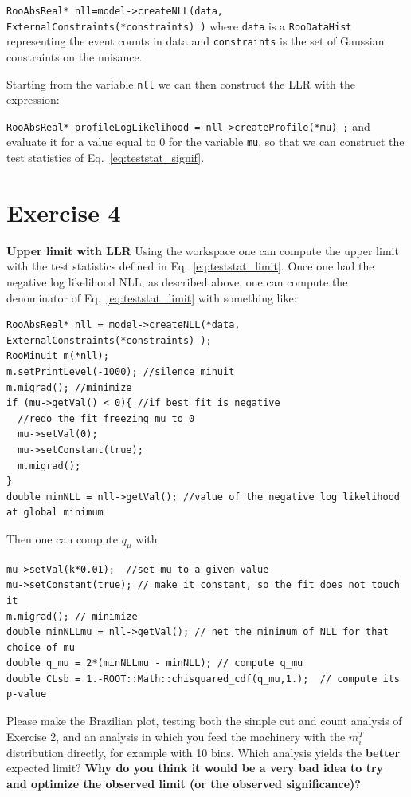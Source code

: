 \documentclass[a4paper,12pt]{article}
\begin{document}
\verb+RooAbsReal* nll=model->createNLL(data, ExternalConstraints(*constraints) )+
where \verb+data+ is a \verb!RooDataHist! representing the event counts in data
and \verb+constraints+ is the set of Gaussian constraints on the nuisance.

Starting from the variable \verb+nll+ we can then construct the LLR with the
expression:

\verb+RooAbsReal* profileLogLikelihood = nll->createProfile(*mu) ;+
and evaluate it for a value equal to 0 for the variable \verb+mu+, so that we
can construct the test statistics of Eq.~\ref{eq:teststat_signif}.


\section*{Exercise 4}
{\bf Upper limit with LLR}
Using the workspace one can compute the upper limit with the test statistics
defined in Eq.~\ref{eq:teststat_limit}.
Once one had the negative log likelihood NLL, as described above, one can
compute the denominator of Eq.~\ref{eq:teststat_limit} with something like:

\begin{lstlisting}
RooAbsReal* nll = model->createNLL(*data, ExternalConstraints(*constraints) );
RooMinuit m(*nll);
m.setPrintLevel(-1000); //silence minuit
m.migrad(); //minimize
if (mu->getVal() < 0){ //if best fit is negative
  //redo the fit freezing mu to 0
  mu->setVal(0);
  mu->setConstant(true);
  m.migrad();
}
double minNLL = nll->getVal(); //value of the negative log likelihood at global minimum
\end{lstlisting}

Then one can compute $q_\mu$ with
\begin{lstlisting}
mu->setVal(k*0.01);  //set mu to a given value
mu->setConstant(true); // make it constant, so the fit does not touch it
m.migrad(); // minimize
double minNLLmu = nll->getVal(); // net the minimum of NLL for that choice of mu
double q_mu = 2*(minNLLmu - minNLL); // compute q_mu
double CLsb = 1.-ROOT::Math::chisquared_cdf(q_mu,1.);  // compute its p-value 
\end{lstlisting}

Please make the Brazilian plot, testing both the simple cut and count analysis
of Exercise 2, and an analysis in which you feed the machinery with the
$m^T_i$ distribution directly, for example with 10 bins. Which analysis
yields the {\bf better} expected limit? {\bf Why do you think it would be a very
bad idea to try and optimize the observed limit (or the observed
significance)?}
\end{document}
